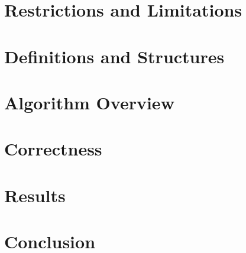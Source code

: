 \documentclass[preprint]{sigplanconf}
\begin{document}
\section{Restrictions and Limitations}
		\label{sec:restrictions}
		

\section{Definitions and Structures}
		\label{sec:definitions}
		

\section{Algorithm Overview}
		\label{sec:algorithm}
		

\section{Correctness}
		\label{sec:correctness}
		

\section{Results}
		\label{sec:results}
		

\section{Conclusion}
		\label{sec:conclusion}
		









\softraggedright


\end{document}
